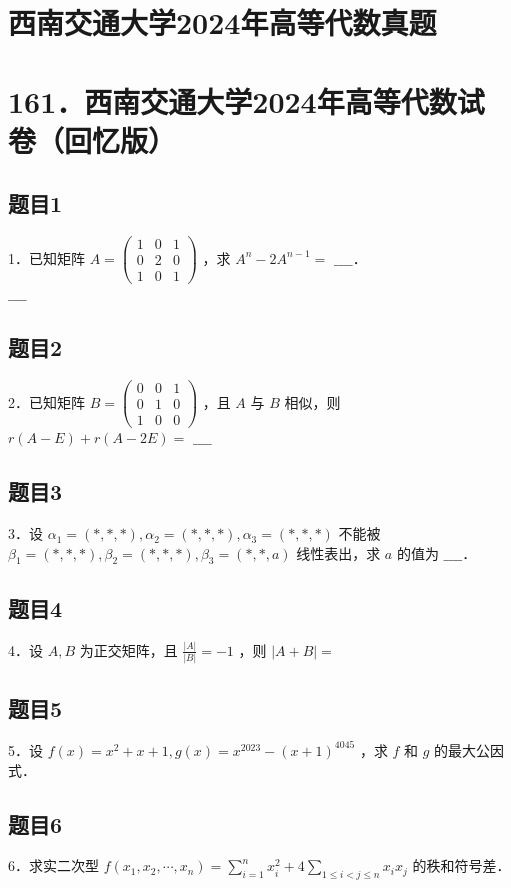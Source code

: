 \documentclass{article}
\begin{document}
\section*{西南交通大学2024年高等代数真题}
\section*{161．西南交通大学2024年高等代数试卷（回忆版）}

\subsection{题目1}
1．已知矩阵 \(A=\left(\begin{array}{lll}1 & 0 & 1 \\ 0 & 2 & 0 \\ 1 & 0 & 1\end{array}\right)\) ，求 \(A^{n}-2 A^{n-1}=\) \(\_\_\_\_\)．\\
\(\_\_\_\_\)

\subsection{题目2}
2．已知矩阵 \(B=\left(\begin{array}{lll}0 & 0 & 1 \\ 0 & 1 & 0 \\ 1 & 0 & 0\end{array}\right)\) ，且 \(A\) 与 \(B\) 相似，则 \(r(A-E)+r(A-2 E)=\) \(\_\_\_\_\)

\subsection{题目3}
3．设 \(\alpha_{1}=(*, *, *), \alpha_{2}=(*, *, *), \alpha_{3}=(*, *, *)\) 不能被 \(\beta_{1}=(*, *, *), \beta_{2}=(*, *, *), \beta_{3}=(*, *, a)\) 线性表出，求 \(a\) 的值为 \(\_\_\_\_\)．

\subsection{题目4}
4．设 \(A, B\) 为正交矩阵，且 \(\frac{|A|}{|B|}=-1\) ，则 \(|A+B|=\)

\subsection{题目5}
5．设 \(f(x)=x^{2}+x+1, g(x)=x^{2023}-(x+1)^{4045}\) ，求 \(f\) 和 \(g\) 的最大公因式．

\subsection{题目6}
6．求实二次型 \(f\left(x_{1}, x_{2}, \cdots, x_{n}\right)=\sum_{i=1}^{n} x_{i}^{2}+4 \sum_{1 \leq i<j \leq n} x_{i} x_{j}\) 的秩和符号差．
\end{document}
